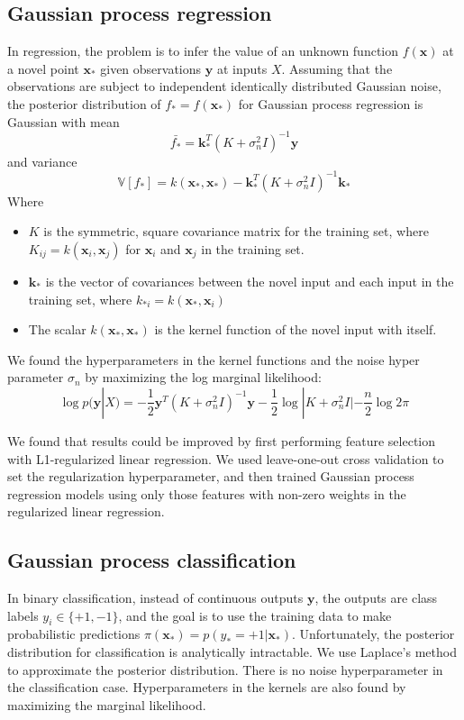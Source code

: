 \documentclass[12pt]{article}
\begin{document}
	\subsection*{Gaussian process regression}
	In regression, the problem is to infer the value of an unknown function $f(\mathbf{x})$ at a novel point $\mathbf{x_*}$ given observations $\mathbf{y}$ at inputs $X$. Assuming that the observations are subject to independent identically distributed Gaussian noise, the posterior distribution of $f_* = f(\mathbf{x_*})$ for Gaussian process regression is Gaussian with mean
	\begin{equation}  
	\bar{f_*} = \mathbf{k}_*^T(K+\sigma_n^2I)^{-1}\mathbf{y}
	\label{eqn:regr_mean}
	\end{equation}
	and variance 
	\begin{equation}  
	\mathbb{V}[f_*] = k(\mathbf{x}_*,\mathbf{x}_*) - \mathbf{k}_*^T(K+\sigma_n^2I)^{-1}\mathbf{k}_*
	\label{eqn:regr_var}
	\end{equation}
	Where
	\begin{itemize}
		\item $K$ is the symmetric, square covariance matrix for the training set, where $K_{ij} = k(\mathbf{x}_i,\mathbf{x}_j)$ for $\mathbf{x}_i$ and $\mathbf{x}_j$ in the training set. 
		\item $\mathbf{k}_*$ is the vector of covariances between the novel input and each input in the training set, where $k_{*i} = k(\mathbf{x}_*,\mathbf{x}_i)$
		\item The scalar $k(\mathbf{x}_*,\mathbf{x}_*)$ is the kernel function of the novel input with itself. 
	\end{itemize}
	We found the hyperparameters in the kernel functions and the noise hyper parameter $\sigma_n$ by maximizing the log marginal likelihood: 
	\begin{equation}  
	\operatorname{log} p(\mathbf{y}|X) = -\frac{1}{2}\mathbf{y}^T(K+\sigma_n^ 2I)^{-1}\mathbf{y} - \frac{1}{2}\operatorname{log}|K+\sigma_n^ 2I| - 
	\frac{n}{2}\operatorname{log}2\pi
	\end{equation}
	
	We found that results could be improved by first performing feature selection with L1-regularized linear regression. We used leave-one-out cross validation to set the regularization hyperparameter, and then trained Gaussian process regression models using only those features with non-zero weights in the regularized linear regression. 
	
	\subsection*{Gaussian process classification}
	In binary classification, instead of continuous outputs $\mathbf{y}$, the outputs are class labels $y_i\in \{+1,-1\}$, and the goal is to use the training data to make probabilistic predictions $\pi(\mathbf{x}_*) = p(y_*=+1|\mathbf{x}_*)$. Unfortunately, the posterior distribution for classification is analytically intractable. We use Laplace's method to approximate the posterior distribution. There is no noise hyperparameter in the classification case. Hyperparameters in the kernels are also found by maximizing the marginal likelihood. 
	
\end{document}
